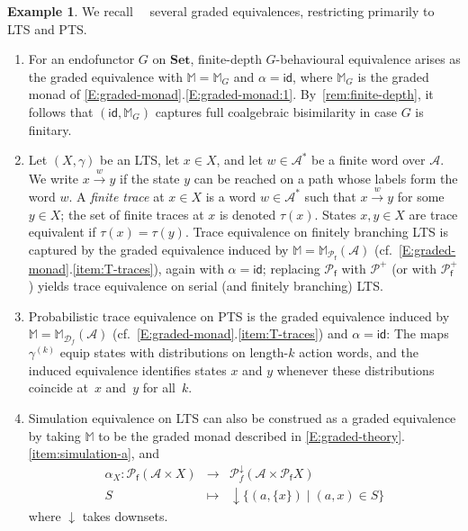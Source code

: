 \documentclass[sigconf,
			final%
			nonacm
                        ]{acmart}
\numberwithin{equation}{section}
\numberwithin{equation}{section}
\theoremstyle{plain}
\theoremstyle{definition}
\newtheorem{expl}[thm]{Example}
\newcommand{\id}{\mathsf{id}}
\newcommand{\xra}[1]{\xrightarrow{~#1~}}
\newcommand{\M}{\mathbb{M}}                   %
\newcommand{\Set}{\mathbf{Set}}
\newcommand{\A}{\mathcal{A}}            %
\newcommand{\pow}{\mathscr P}              %
\newcommand{\powf}{\pow_{\mathsf f}}
\newcommand{\CalD}{\mathcal{D}}            %
\begin{document}
\begin{expl}\label{E:semantics}
We recall~~\cite[Section 4]{DMS19} several graded
equivalences, restricting primarily to LTS and PTS.
\begin{enumerate}
\item\label{item:sem-beh}
 For an endofunctor $G$ on $\Set$, finite-depth
 $G$-behavioural equivalence arises as the
 graded equivalence with $\M = \M_G$ and
 $\alpha = \id$, where $\M_G$ is the graded
 monad of
 \cref{E:graded-monad}.\ref{E:graded-monad:1}.
 By~\cref{rem:finite-depth}, it follows that
 $(\id, \M_G)$ captures full coalgebraic bisimilarity
 in case $G$ is finitary.

\item\label{item:sem-trace} Let $(X, \gamma)$ be an LTS, let
  ${x\in X}$, and let ${w\in\A^*}$ be a finite word over $\A$. We
  write $x\xra{w} y$ if the state $y$ can be reached on a path whose
  labels form the word $w$. A \emph{finite trace} at $x\in X$ is a
  word $w\in\A^*$ such that $x\xra{w} y$ for some $y\in X$; the set of
  finite traces at $x$ is denoted $\tau(x)$. States $x,y\in X$ are
  trace equivalent if $\tau(x)=\tau(y)$. Trace equivalence on finitely
  branching LTS is captured by the graded equivalence induced by
  $\M=\M_{\powf}(\A)$
  (cf.~\cref{E:graded-monad}.\ref{item:T-traces}), again with
  $\alpha=\id$; replacing $\powf$ with $\pow^+$ (or with $\powf^+$)
  yields trace equivalence on serial (and finitely branching) LTS.

\item\label{item:sem-prob} Probabilistic trace equivalence on PTS is
  the graded equivalence induced by $\M=\M_{\CalD_f}(\A)$
  (cf.~\cref{E:graded-monad}.\ref{item:T-traces}) and
  $\alpha = \id$: The maps~$\gamma^{(k)}$ equip states with
  distributions on length-$k$ action words, and the induced
  equivalence identifies states $x$ and $y$ whenever these
  distributions coincide at~$x$ and~$y$ for all~$k$.

\item\label{item:sem-sim}
Simulation equivalence on LTS can also be
construed as a graded equivalence by taking
$\M$ to be the graded monad described in
\cref{E:graded-theory}.\ref{item:simulation-a},
and
  \begin{eqnarray*}
    \alpha_X\colon\powf(\A\times
    X) & \to & \pow^{\downarrow}_f(\A\times\powf X) \\
    S\ & \mapsto &
    {\downarrow}\{(a,\{x\})\mid (a,x)\in S\}
  \end{eqnarray*}
where $\downarrow$ takes downsets.
\end{enumerate}
\end{expl}
\end{document}
